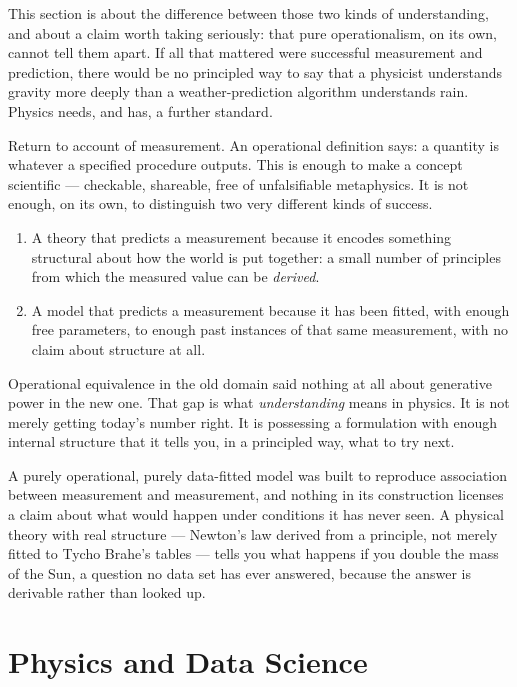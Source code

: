 This section is about the difference between those two kinds of understanding,
and about a claim worth taking seriously: that pure operationalism, on its own,
cannot tell them apart. If all that mattered were successful measurement and
prediction, there would be no principled way to say that a physicist
understands gravity more deeply than a weather-prediction algorithm understands
rain. Physics needs, and has, a further standard.

Return to  account of measurement. An operational definition says: a quantity
is whatever a specified procedure outputs. This is enough to make a concept
scientific --- checkable, shareable, free of unfalsifiable metaphysics. It is
not enough, on its own, to distinguish two very different kinds of success.
\begin{enumerate}
\item A theory that predicts a measurement because it encodes something
    structural about how the world is put together: a small number of
        principles from which the measured value can be \emph{derived}.
\item A model that predicts a measurement because it has been fitted, with
    enough free parameters, to enough past instances of that same measurement,
        with no claim about structure at all.
\end{enumerate}

Operational equivalence in the old domain said nothing at all
about generative power in the new one. That gap is what
\emph{understanding} means in physics. It is not merely getting
today's number right. It is possessing a formulation with enough
internal structure that it tells you, in a principled way, what
to try next.

A purely operational, purely data-fitted model was built to reproduce association between
measurement and measurement, and nothing in its construction licenses a claim
about what would happen under conditions it has never seen. A physical theory
with real structure --- Newton's law derived from a principle, not merely
fitted to Tycho Brahe's tables ---  tells you what happens if you double the mass
of the Sun, a question no data set has ever answered, because the answer is
derivable rather than looked up.

\section{Physics and Data Science}
\label{rm:pds}

